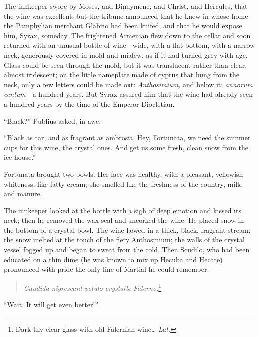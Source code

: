 The innkeeper swore by Moses, and Dindymene, and Christ, and Hercules, that the wine was excellent; but the tribune announced that he knew in whose home the Pamphylian merchant Glabrio had been knifed, and that he would expose him, Syrax, someday. The frightened Armenian flew down to the cellar and soon returned with an unusual bottle of wine---wide, with a flat bottom, with a narrow neck, generously covered in mold and mildew, as if it had turned grey with age. Glass could be seen through the mold, but it was translucent rather than clear, almost iridescent; on the little nameplate made of cyprus that hung from the neck, only a few letters could be made out: \textit{Anthosimium,} and below it: \textit{annorum centum}---a hundred years. But Syrax assured him that the wine had already seen a hundred years by the time of the Emperor Diocletian.

``Black?'' Publius asked, in awe. %

``Black as tar, and as fragrant as ambrosia. Hey, Fortunata, we need the summer cups for this wine, the crystal ones. And get us some fresh, clean snow from the ice-house.'' %

Fortunata brought two bowls. Her face was healthy, with a pleasant, yellowish whiteness, like fatty cream; she smelled like the freshness of the country, milk, and manure.

The innkeeper looked at the bottle with a sigh of deep emotion and kissed its neck; then he removed the wax seal and uncorked the wine. He placed snow in the bottom of a crystal bowl. The wine flowed in a thick, black, fragrant stream; the snow melted at the touch of the fiery Anthosmium; the walls of the crystal vessel fogged up and began to sweat from the cold. Then Scudilo, who had been educated on a thin dime (he was known to mix up Hecuba and Hecate) pronounced with pride the only line of Martial he could remember:

\begin{quote}
	{\textit{Candida nigrescant vetulo crystalla Falerno.}\footnote{Dark thy clear glass with old Falernian wine\ldots{} \textit{Lat.}}}
\end{quote}

``Wait. It will get even better!'' %

